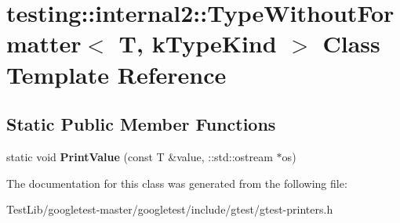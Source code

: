 \hypertarget{classtesting_1_1internal2_1_1TypeWithoutFormatter}{}\section{testing\+:\+:internal2\+:\+:Type\+Without\+Formatter$<$ T, k\+Type\+Kind $>$ Class Template Reference}
\label{classtesting_1_1internal2_1_1TypeWithoutFormatter}
\subsection*{Static Public Member Functions}
\begin{DoxyCompactItemize}
\item 
\mbox{\label{classtesting_1_1internal2_1_1TypeWithoutFormatter_a6651f6f7be2c0f899729eeb6038f76d3}} 
static void {\bfseries Print\+Value} (const T \&value, \+::std\+::ostream $\ast$os)
\end{DoxyCompactItemize}


The documentation for this class was generated from the following file\+:\begin{DoxyCompactItemize}
\item 
Test\+Lib/googletest-\/master/googletest/include/gtest/gtest-\/printers.\+h\end{DoxyCompactItemize}
